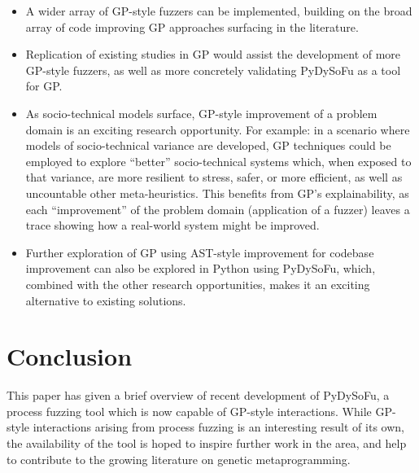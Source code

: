 \documentclass[draft,12pt]{llncs}   %
\begin{document}
\begin{itemize}
\item A wider array of GP-style fuzzers can be implemented, building on the
  broad array of code improving GP approaches surfacing in the literature.

\item Replication of existing studies in GP would assist the development of more
GP-style fuzzers, as well as more concretely validating PyDySoFu as a tool for
GP.
  
\item As socio-technical models surface, GP-style improvement of a problem
  domain is an exciting research opportunity. For example: in a scenario where
  models of socio-technical variance are developed, GP techniques could be
  employed to explore ``better'' socio-technical systems which, when exposed to
  that variance, are more resilient to stress, safer, or more efficient, as well
  as uncountable other meta-heuristics. This benefits from GP's explainability,
  as each ``improvement'' of the problem domain (application of a fuzzer) leaves
  a trace showing how a real-world system might be improved.

\item Further exploration of GP using AST-style improvement for codebase
  improvement can also be explored in Python using PyDySoFu, which, combined
  with the other research opportunities, makes it an exciting alternative to
  existing solutions.
\end{itemize}


\section{Conclusion}
This paper has given a brief overview of recent development of PyDySoFu, a
process fuzzing tool which is now capable of GP-style interactions. While
GP-style interactions arising from process fuzzing is an interesting result of
its own, the availability of the tool is hoped to inspire further work in the
area, and help to contribute to the growing literature on genetic
metaprogramming.\par



\end{document}
